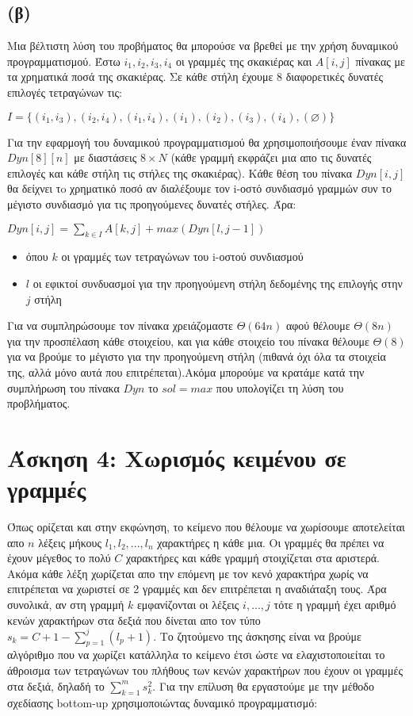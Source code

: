 \documentclass[a4paper,12pt]{report}
\begin{document}
\subsection*{(β)}
Μια βέλτιστη λύση του προβήματος θα μπορούσε να βρεθεί με την χρήση δυναμικού προγραμματισμού. Έστω $i_1,i_2,i_3,i_4$ οι γραμμές της σκακιέρας και $A[i,j]$ πίνακας με τα χρηματικά ποσά της σκακιέρας. Σε κάθε στήλη έχουμε 8 διαφορετικές δυνατές επιλογές τετραγώνων τις: 
\begin{center}
$I=\{(i_1,i_3),(i_2,i_4),(i_1,i_4),(i_1),(i_2),(i_3),(i_4),(\varnothing)\}$
\end{center}
Για την εφαρμογή του δυναμικού προγραμματισμού θα χρησιμοποιήσουμε έναν πίνακα $Dyn[8][n]$ με διαστάσεις $8 \times N$ (κάθε γραμμή εκφράζει μια απο τις δυνατές επιλογές και κάθε στήλη τις στήλες της σκακιέρας). Kάθε θέση του πίνακα $Dyn[i,j]$ θα δείχνει τo χρηματικό ποσό αν διαλέξουμε τον i-οστό συνδιασμό γραμμών συν το μέγιστο συνδιασμό για τις προηγούμενες δυνατές στήλες. Άρα:
\begin{center}
 $Dyn[i,j]=\displaystyle\sum\limits_{k \in I}{}{A[k,j]} + max(Dyn[l,j-1])$ 
\begin{itemize}
 \item όπου $k$ οι γραμμές των τετραγώνων του i-οστού συνδιασμού
 \item $l$ οι εφικτοί συνδυασμοί για την προηγούμενη στήλη δεδομένης της επιλογής στην $j$ στήλη
\end{itemize}
\end{center}

Για να συμπληρώσουμε τον πίνακα χρειάζομαστε $\Theta(64n)$ αφού θέλουμε $\Theta(8n)$ για την προσπέλαση κάθε στοιχείου, και για κάθε στοιχείο του πίνακα θέλουμε $\Theta(8)$ για να βρούμε το μέγιστο για την προηγούμενη στήλη (πιθανά όχι όλα τα στοιχεία της, αλλά μόνο αυτά που επιτρέπεται).Ακόμα μπορούμε να κρατάμε κατά την συμπλήρωση του πίνακα $Dyn$ το $sol=max$ που υπολογίζει τη λύση του προβλήματος.  

\section*{Άσκηση 4: Χωρισμός κειμένου σε γραμμές}
Όπως ορίζεται και στην εκφώνηση, το κείμενο που θέλουμε να χωρίσουμε αποτελείται απο $n$ λέξεις μήκους $l_1,l_2,...,l_n$ χαρακτήρες η κάθε μια. Οι γραμμές θα πρέπει να έχουν μέγεθος το πολύ $C$ χαρακτήρες και κάθε γραμμή στοιχίζεται στα αριστερά. Ακόμα κάθε λέξη χωρίζεται απο την επόμενη με τον κενό χαρακτήρα χωρίς να επιτρέπεται να χωριστεί σε 2 γραμμές και δεν επιτρέπεται η αναδιάταξη τους. Άρα συνολικά, αν στη γραμμή $k$ εμφανίζονται οι λέξεις $i,...,j$ τότε η γραμμή έχει αριθμό κενών χαρακτήρων στα δεξιά που δίνεται απο τον τύπο $s_k=C+1-\sum_{p=1}^{j}{(l_p+1)}$. Το ζητούμενο της άσκησης είναι να βρούμε αλγόριθμο που να χωρίζει κατάλληλα το κείμενο έτσι ώστε να ελαχιστοποιείται το άθροισμα των τετραγώνων του πλήθους των κενών χαρακτήρων που έχουν οι γραμμές στα δεξιά, δηλαδή το $\sum_{k=1}^{m}{s_k^2}$. Για την επίλυση θα εργαστούμε με την μέθοδο σχεδίασης bottom-up χρησιμοποιώντας δυναμικό προγραμματισμό:
\end{document}
